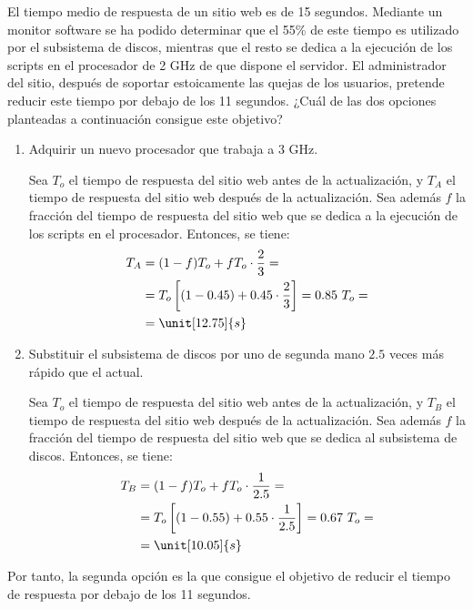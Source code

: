 \begin{ejercicio}
El tiempo medio de respuesta de un sitio web es de 15 segundos. Mediante un monitor software se ha podido determinar que el 55\% de este tiempo es utilizado por el subsistema de discos, mientras que el resto se dedica a la ejecución de los scripts en el procesador de 2 GHz de que dispone el servidor. El administrador del sitio, después de soportar estoicamente las quejas de los usuarios, pretende reducir este tiempo por debajo de los 11 segundos. ¿Cuál de las dos opciones planteadas a continuación consigue este objetivo?
\begin{enumerate}
    \item Adquirir un nuevo procesador que trabaja a 3 GHz.
    
    Sea $T_o$ el tiempo de respuesta del sitio web antes de la actualización, y $T_A$ el tiempo de respuesta del sitio web después de la actualización. Sea además $f$ la fracción del tiempo de respuesta del sitio web que se dedica a la ejecución de los scripts en el procesador. Entonces, se tiene:
    \begin{align*}
        T_A &= (1-f)T_o + fT_o\cdot \dfrac{2}{3}
        =\\&= T_o\left[(1-0.45) + 0.45\cdot \dfrac{2}{3}\right]
        = 0.85\ T_o
        =\\&= \unit[12.75]{s}
    \end{align*}
    \item Substituir el subsistema de discos por uno de segunda mano $2.5$ veces más rápido que el actual.
    
    Sea $T_o$ el tiempo de respuesta del sitio web antes de la actualización, y $T_B$ el tiempo de respuesta del sitio web después de la actualización. Sea además $f$ la fracción del tiempo de respuesta del sitio web que se dedica al subsistema de discos. Entonces, se tiene:
    \begin{align*}
        T_B &= (1-f)T_o + fT_o\cdot \dfrac{1}{2.5}
        =\\&= T_o\left[(1-0.55) + 0.55\cdot \dfrac{1}{2.5}\right]
        = 0.67\ T_o
        =\\&= \unit[10.05]{s}
    \end{align*}
\end{enumerate}

Por tanto, la segunda opción es la que consigue el objetivo de reducir el tiempo de respuesta por debajo de los 11 segundos.
\end{ejercicio}
\begin{comment}
SOLUCIÓN: La segunda opción consigue un tiempo de respuesta aproximado de 10 segundos.
\end{comment}

